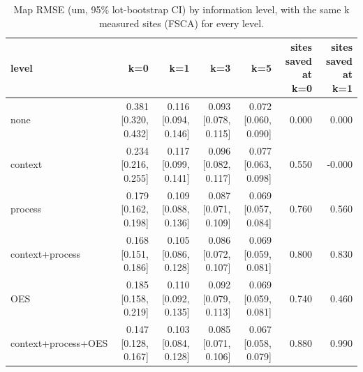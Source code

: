 \begin{table}[t]
\centering
\caption{Map RMSE (um, 95\% lot-bootstrap CI) by information level, with the same k measured sites (FSCA) for every level.}
\label{tab:info}
\footnotesize
\begin{tabular}{lrrrrrr}
\toprule
level & k=0 & k=1 & k=3 & k=5 & sites saved at k=0 & sites saved at k=1 \\
\midrule
none & 0.381 [0.320, 0.432] & 0.116 [0.094, 0.146] & 0.093 [0.078, 0.115] & 0.072 [0.060, 0.090] & 0.000 & 0.000 \\
context & 0.234 [0.216, 0.255] & 0.117 [0.099, 0.141] & 0.096 [0.082, 0.117] & 0.077 [0.063, 0.098] & 0.550 & -0.000 \\
process & 0.179 [0.162, 0.198] & 0.109 [0.088, 0.136] & 0.087 [0.071, 0.109] & 0.069 [0.057, 0.084] & 0.760 & 0.560 \\
context+process & 0.168 [0.151, 0.186] & 0.105 [0.086, 0.128] & 0.086 [0.072, 0.107] & 0.069 [0.059, 0.081] & 0.800 & 0.830 \\
OES & 0.185 [0.158, 0.219] & 0.110 [0.092, 0.135] & 0.092 [0.079, 0.113] & 0.069 [0.059, 0.081] & 0.740 & 0.460 \\
context+process+OES & 0.147 [0.128, 0.167] & 0.103 [0.084, 0.128] & 0.085 [0.071, 0.106] & 0.067 [0.058, 0.079] & 0.880 & 0.990 \\
\bottomrule
\end{tabular}
\end{table}
